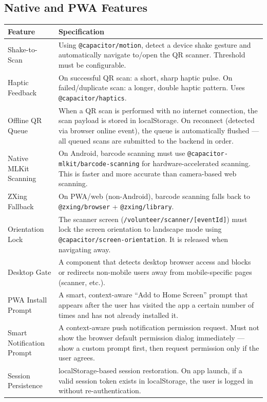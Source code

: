 \documentclass[12pt,a4paper]{article}
\begin{document}
\subsection{Native and PWA Features}

\begin{tabularx}{\textwidth}{L{4.5cm} X}
\toprule
{}
\textbf{Feature} & \textbf{Specification} \\
\midrule
Shake-to-Scan & Using \texttt{@capacitor/motion}, detect a device shake gesture and automatically navigate to/open the QR scanner. Threshold must be configurable. \\
Haptic Feedback & On successful QR scan: a short, sharp haptic pulse. On failed/duplicate scan: a longer, double haptic pattern. Uses \texttt{@capacitor/haptics}. \\
Offline QR Queue & When a QR scan is performed with no internet connection, the scan payload is stored in localStorage. On reconnect (detected via browser online event), the queue is automatically flushed — all queued scans are submitted to the backend in order. \\
Native MLKit Scanning & On Android, barcode scanning must use \texttt{@capacitor-mlkit/barcode-scanning} for hardware-accelerated scanning. This is faster and more accurate than camera-based web scanning. \\
ZXing Fallback & On PWA/web (non-Android), barcode scanning falls back to \texttt{@zxing/browser} + \texttt{@zxing/library}. \\
Orientation Lock & The scanner screen (\texttt{/volunteer/scanner/[eventId]}) must lock the screen orientation to landscape mode using \texttt{@capacitor/screen-orientation}. It is released when navigating away. \\
Desktop Gate & A component that detects desktop browser access and blocks or redirects non-mobile users away from mobile-specific pages (scanner, etc.). \\
PWA Install Prompt & A smart, context-aware ``Add to Home Screen'' prompt that appears after the user has visited the app a certain number of times and has not already installed it. \\
Smart Notification Prompt & A context-aware push notification permission request. Must not show the browser default permission dialog immediately — show a custom prompt first, then request permission only if the user agrees. \\
Session Persistence & localStorage-based session restoration. On app launch, if a valid session token exists in localStorage, the user is logged in without re-authentication. \\

\end{tabularx}
\end{document}
